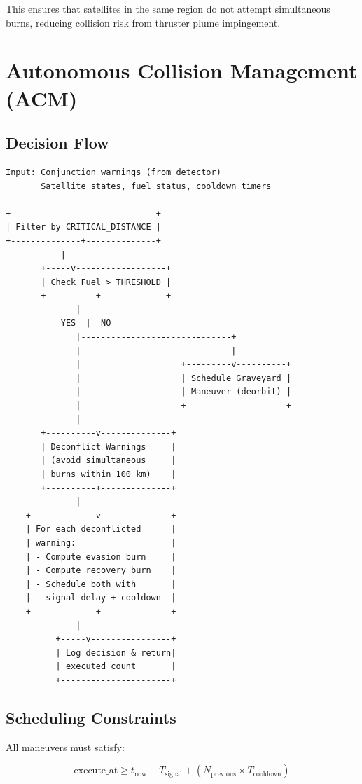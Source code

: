 \documentclass[11pt,a4paper]{article}
\begin{document}
This ensures that satellites in the same region do not attempt simultaneous burns, reducing collision risk from thruster plume impingement.

\section{Autonomous Collision Management (ACM)}

\subsection{Decision Flow}

\begin{verbatim}
Input: Conjunction warnings (from detector)
       Satellite states, fuel status, cooldown timers

+-----------------------------+
| Filter by CRITICAL_DISTANCE |
+--------------+--------------+
           |
       +-----v------------------+
       | Check Fuel > THRESHOLD |
       +----------+-------------+
              |
           YES  |  NO
              |------------------------------+
              |                              |
              |                    +---------v----------+
              |                    | Schedule Graveyard |
              |                    | Maneuver (deorbit) |
              |                    +--------------------+
              |
       +----------v--------------+
       | Deconflict Warnings     |
       | (avoid simultaneous     |
       | burns within 100 km)    |
       +----------+--------------+
              |
    +-------------v--------------+
    | For each deconflicted      |
    | warning:                   |
    | - Compute evasion burn     |
    | - Compute recovery burn    |
    | - Schedule both with       |
    |   signal delay + cooldown  |
    +-------------+--------------+
              |
          +-----v----------------+
          | Log decision & return|
          | executed count       |
          +----------------------+
\end{verbatim}

\subsection{Scheduling Constraints}

All maneuvers must satisfy:

\begin{equation}
\text{execute\_at} \geq t_{\text{now}} + T_{\text{signal}} + (N_{\text{previous}} \times T_{\text{cooldown}})
\end{equation}
\end{document}
